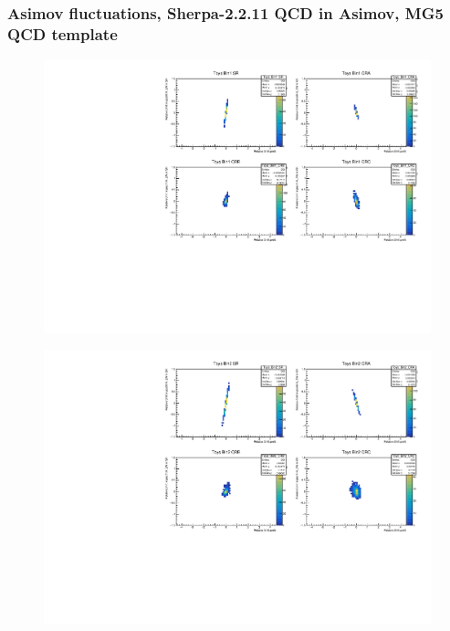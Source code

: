 \subsubsection{\mjj Asimov fluctuations, Sherpa-2.2.11 QCD in Asimov, MG5 QCD template}
\begin{figure}[H]
\includegraphics[width=\textwidth]{plots/diffx/instab/constfx/instabilities_mjj_QCD_Mgraph_Signal_Sh2211_BSDATASTATS_sherpaasimov_bin1.pdf}
\end{figure}
\begin{figure}[H]
\includegraphics[width=\textwidth]{plots/diffx/instab/constfx/instabilities_mjj_QCD_Mgraph_Signal_Sh2211_BSDATASTATS_sherpaasimov_bin2.pdf}
\end{figure}
